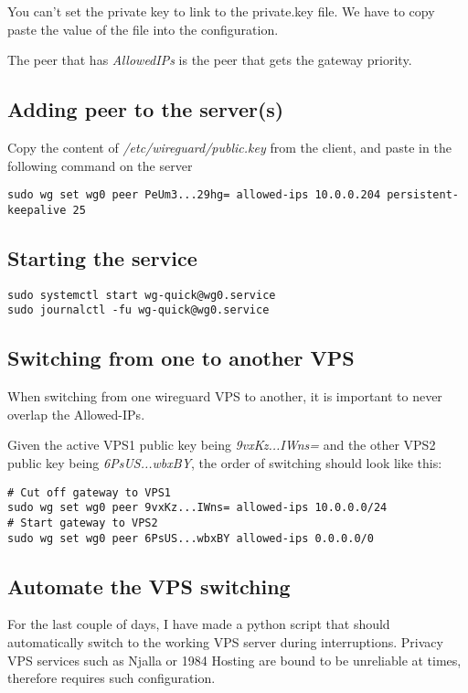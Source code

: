 \documentclass[letterpaper, 11pt]{article}
\begin{document}
You can't set the private key to link to the private.key file. We have to copy paste the value of the file into the configuration.

The peer that has \textit{AllowedIPs} is the peer that gets the gateway priority.

\subsection{Adding peer to the server(s)}
\label{sec:org9cfee12}
Copy the content of \textit{/etc/wireguard/public.key} from the client, and paste in the following command on the server

\begin{verbatim}
sudo wg set wg0 peer PeUm3...29hg= allowed-ips 10.0.0.204 persistent-keepalive 25
\end{verbatim}

\subsection{Starting the service}
\label{sec:org13ac0f6}
\begin{verbatim}
sudo systemctl start wg-quick@wg0.service
sudo journalctl -fu wg-quick@wg0.service
\end{verbatim}

\subsection{Switching from one to another VPS}
\label{sec:org57c70c9}
When switching from one wireguard VPS to another, it is important to never overlap the Allowed-IPs.

Given the active VPS1 public key being \textit{9vxKz...IWns=} and the other VPS2 public key being \textit{6PsUS...wbxBY}, the order of switching should look like this:

\begin{verbatim}
# Cut off gateway to VPS1
sudo wg set wg0 peer 9vxKz...IWns= allowed-ips 10.0.0.0/24
# Start gateway to VPS2
sudo wg set wg0 peer 6PsUS...wbxBY allowed-ips 0.0.0.0/0
\end{verbatim}

\subsection{Automate the VPS switching}
\label{sec:org580cfa5}
For the last couple of days, I have made a python script that should automatically switch to the working VPS server during interruptions.
Privacy VPS services such as Njalla or 1984 Hosting are bound to be unreliable at times, therefore requires such configuration.
\end{document}
